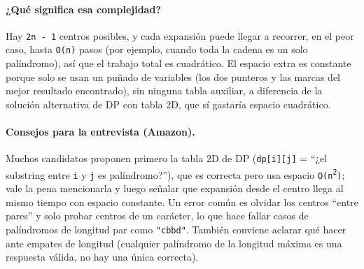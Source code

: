 


\paragraph{¿Qué significa esa complejidad?} Hay \texttt{2n - 1} centros
posibles, y cada expansión puede llegar a recorrer, en el peor caso, hasta
\texttt{O(n)} pasos (por ejemplo, cuando toda la cadena es un solo
palíndromo), así que el trabajo total es cuadrático. El espacio extra es
constante porque solo se usan un puñado de variables (los dos punteros y las
marcas del mejor resultado encontrado), sin ninguna tabla auxiliar, a
diferencia de la solución alternativa de DP con tabla 2D, que sí gastaría
espacio cuadrático.

\paragraph{Consejos para la entrevista (Amazon).} Muchos candidatos proponen
primero la tabla 2D de DP (\texttt{dp[i][j]} = ``¿el substring entre
\texttt{i} y \texttt{j} es palíndromo?''), que es correcta pero usa espacio
\texttt{O(n\textsuperscript{2})}; vale la pena mencionarla y luego señalar
que expansión desde el centro llega al mismo tiempo con espacio constante.
Un error común es olvidar los centros ``entre pares'' y solo probar centros
de un carácter, lo que hace fallar casos de palíndromos de longitud par como
\texttt{"cbbd"}. También conviene aclarar qué hacer ante empates de longitud
(cualquier palíndromo de la longitud máxima es una respuesta válida, no hay
una única correcta).

